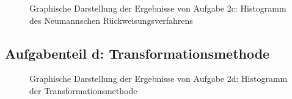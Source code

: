 \begin{landscape}
	\begin{figure}
		\caption{Graphische Darstellung der Ergebnisse von Aufgabe 2c: Histogramm des Neumannschen Rückweisungsverfahrens}
		\label{fig:2c}
	\end{figure}
\end{landscape}

\subsection*{Aufgabenteil d: Transformationsmethode}
\begin{landscape}
	\begin{figure}
		\caption{Graphische Darstellung der Ergebnisse von Aufgabe 2d: Histogramm der Transformationsmethode}
		\label{fig:2d}
	\end{figure}
\end{landscape}



